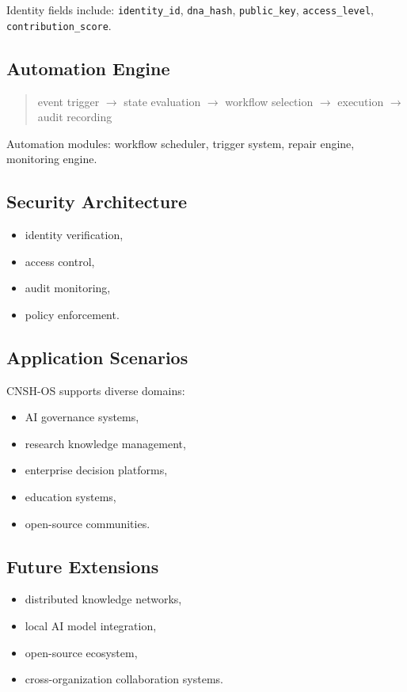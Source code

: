 \documentclass[conference]{IEEEtran}
\begin{document}
Identity fields include: \texttt{identity\_id}, \texttt{dna\_hash},
\texttt{public\_key}, \texttt{access\_level},
\texttt{contribution\_score}.

\subsection{Automation Engine}

\begin{quote}
event trigger $\to$ state evaluation $\to$ workflow selection
$\to$ execution $\to$ audit recording
\end{quote}

Automation modules: workflow scheduler, trigger system,
repair engine, monitoring engine.

\subsection{Security Architecture}

\begin{itemize}[nosep]
  \item identity verification,
  \item access control,
  \item audit monitoring,
  \item policy enforcement.
\end{itemize}

\subsection{Application Scenarios}

CNSH-OS supports diverse domains:
\begin{itemize}[nosep]
  \item AI governance systems,
  \item research knowledge management,
  \item enterprise decision platforms,
  \item education systems,
  \item open-source communities.
\end{itemize}

\subsection{Future Extensions}

\begin{itemize}[nosep]
  \item distributed knowledge networks,
  \item local AI model integration,
  \item open-source ecosystem,
  \item cross-organization collaboration systems.
\end{itemize}
\end{document}
